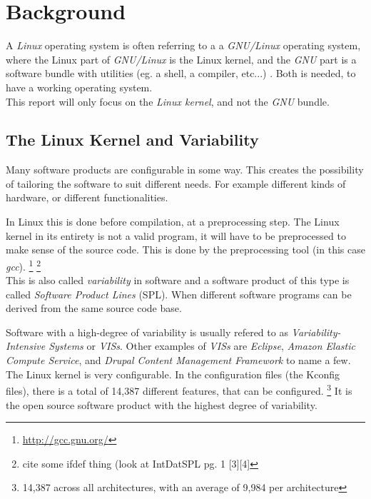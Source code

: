 \documentclass[a4paper,11pt]{report}
\makeatletter
\newcommand{\cit}[1]{
    \citeleft\@biblabel{#1}\citeright
}
\makeatother
\begin{document}
        \chapter{Background}

A \emph{Linux} operating system is often referring to a a \emph{GNU/Linux} 
operating system, where the Linux part of \emph{GNU/Linux} is the Linux kernel, 
and the \emph{GNU} part is a software bundle with utilities (eg. a shell, a 
compiler, etc...) \cit{gnupack}. Both is 
needed, to have a working operating system. 
\\

This report will only focus on the \emph{Linux kernel}, and not the \emph{GNU} 
bundle.


        \section{The Linux Kernel and Variability}

Many software products are configurable in some way. This creates the 
possibility of tailoring the software to suit different needs. For example 
different kinds of hardware, or different functionalities. 

In Linux this is done before compilation, at a preprocessing step. The Linux 
kernel in its entirety is not a valid program, it will have to be preprocessed 
to make sense of the source code.
This is done by the preprocessing tool (in this case \emph{gcc}).
    \cite[p. 1]{IntDatSPL}
    \footnote{\url{http://gcc.gnu.org/}}
    \footnote{cite some ifdef thing (look at IntDatSPL pg. 1 [3][4]}
\\

This is also called \emph{variability} in software and a software product of 
this type is called \emph{Software Product Lines} (SPL). When different 
software programs can be derived from the same source code base. 

Software with a high-degree of variability is usually refered to as 
\emph{Variability-Intensive Systems} or \emph{VISs}. Other examples of 
\emph{VISs} are \emph{Eclipse}, \emph{Amazon Elastic Compute Service}, and 
\emph{Drupal Content Management Framework} 
    \cite[p. 1]{VarTesDrupal}
to name a few.
\\

The Linux kernel is very configurable. In the configuration files (the Kconfig 
files), there is a total of 14,387 different features, that can be configured.
    \footnote {14,387 across all architectures, with an average of 9,984 per 
        architecture}
It is the open source software product with the highest degree of variability.
\end{document}
